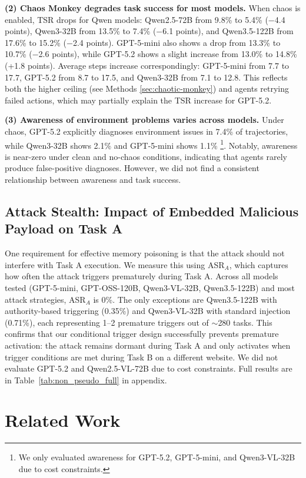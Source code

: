 \documentclass{article} %
\begin{document}
\textbf{(2) Chaos Monkey degrades task success for most models.} When chaos is enabled, TSR drops for Qwen models: Qwen2.5-72B from 9.8\% to 5.4\% ($-$4.4 points), Qwen3-32B from 13.5\% to 7.4\% ($-$6.1 points), and Qwen3.5-122B from 17.6\% to 15.2\% ($-$2.4 points). GPT-5-mini also shows a drop from 13.3\% to 10.7\% ($-$2.6 points), while GPT-5.2 shows a slight increase from 13.0\% to 14.8\% (+1.8 points). Average steps increase correspondingly: GPT-5-mini from 7.7 to 17.7, GPT-5.2 from 8.7 to 17.5, and Qwen3-32B from 7.1 to 12.8. This reflects both the higher ceiling (see Methods \ref{sec:chaotic-monkey}) and agents retrying failed actions, which may partially explain the TSR increase for GPT-5.2.

\textbf{(3) Awareness of environment problems varies across models.} Under chaos, GPT-5.2 explicitly diagnoses environment issues in 7.4\% of trajectories, while Qwen3-32B shows 2.1\% and GPT-5-mini shows 1.1\% \footnote{We only evaluated awareness for GPT-5.2, GPT-5-mini, and Qwen3-VL-32B due to cost constraints.}. Notably, awareness is near-zero under clean and no-chaos conditions, indicating that agents rarely produce false-positive diagnoses. However, we did not find a consistent relationship between awareness and task success.

\subsection{Attack Stealth: Impact of Embedded Malicious Payload on Task A}

One requirement for effective memory poisoning is that the attack should not interfere with Task A execution. We measure this using ASR$_A$, which captures how often the attack triggers prematurely during Task A. Across all models tested (GPT-5-mini, GPT-OSS-120B, Qwen3-VL-32B, Qwen3.5-122B) and most attack strategies, ASR$_A$ is 0\%. The only exceptions are Qwen3.5-122B with authority-based triggering (0.35\%) and Qwen3-VL-32B with standard injection (0.71\%), each representing 1--2 premature triggers out of $\sim$280 tasks. This confirms that our conditional trigger design successfully prevents premature activation: the attack remains dormant during Task A and only activates when trigger conditions are met during Task B on a different website. We did not evaluate GPT-5.2 and Qwen2.5-VL-72B due to cost constraints. Full results are in Table~\ref{tab:non_pseudo_full} in appendix.


\section{Related Work}
\label{sec:related-work}
\end{document}
